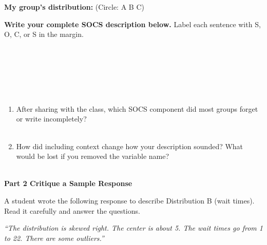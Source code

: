 \documentclass[10pt]{article}
\begin{document}
\vspace{0.12in}

\noindent\textbf{My group's distribution: \blank{3cm}} \hfill
\small (Circle: A \quad B \quad C)

\vspace{0.1in}

\noindent\textbf{Write your complete SOCS description below.}
Label each sentence with S, O, C, or S in the margin.

\vspace{6pt}
\writeline\\[1pt]\writeline\\[1pt]\writeline\\[1pt]\writeline\\[1pt]
\writeline\\[1pt]\writeline

\vspace{0.12in}

\begin{enumerate}[leftmargin=1.5em, itemsep=8pt]
  \item After sharing with the class, which SOCS component did most groups
        forget or write incompletely?\\[5pt]
        \writeline\\[1pt]\writeline

  \item How did including context change how your description sounded?
        What would be lost if you removed the variable name?\\[5pt]
        \writeline\\[1pt]\writeline
\end{enumerate}

\vspace{0.12in}

{\large\bfseries\color{navy} Part 2 \quad Critique a Sample Response}

\vspace{0.1in}

\noindent\small A student wrote the following response to describe Distribution B
(wait times). Read it carefully and answer the questions.

\vspace{0.1in}

\begin{tcolorbox}[colback=redbg, colframe=redacc, boxrule=0.8pt, arc=2mm,
    left=3mm, right=3mm, top=2mm, bottom=2mm]
\small\textit{``The distribution is skewed right. The center is about 5.
The wait times go from 1 to 22. There are some outliers.''}
\end{tcolorbox}
\end{document}
